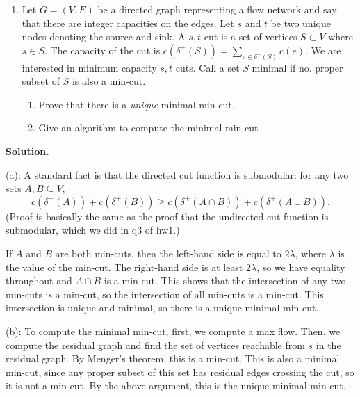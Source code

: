\documentclass[11pt,letterpaper]{article}
\theoremstyle{definition}
\newcommand{\solution}{\medskip\noindent\textbf{Solution.}\par\medskip}
\begin{document}
\begin{enumerate}[resume=q]
\item Let $G = (V, E)$ be a directed graph representing a flow network and say that there are integer capacities on the edges. Let $s$ and $t$ be two unique nodes denoting the source and sink. A $s,t$ cut is a set of vertices $S \subset V$ where $s \in S$. The capacity of the cut is $c(\delta^+(S)) = \sum_{e \in \delta^+(S)} c(e)$. We are interested in minimum capacity $s,t$ cuts. Call a set $S$ minimal if no. proper subset of $S$ is also a min-cut.
\begin{enumerate}
\item Prove that there is a \emph{unique} minimal min-cut.
\item Give an algorithm to compute the minimal min-cut
\end{enumerate}
\end{enumerate}

\solution

(a): A standard fact is that the directed cut function is submodular: for any two sets $A, B \subseteq V$,
\[
c(\delta^+(A)) + c(\delta^+(B)) \geq c(\delta^+(A \cap B)) + c(\delta^+(A \cup B)).   
\] 
(Proof is basically the same as the proof that the undirected cut function is submodular, which we did in q3 of hw1.)

If $A$ and $B$ are both min-cuts, then the left-hand side is equal to $2\lambda$, where $\lambda$ is the value of the min-cut.
The right-hand side is at least $2\lambda$, so we have equality throughout and $A\cap B$ is a min-cut.
This shows that the intersection of any two min-cuts is a min-cut, so the intersection of all min-cuts is a min-cut.
This intersection is unique and minimal, so there is a unique minimal min-cut.

(b): To compute the minimal min-cut, first, we compute a max flow.
Then, we compute the residual graph and find the set of vertices reachable from $s$ in the residual graph.
By Menger's theorem, this is a min-cut.
This is also a minimal min-cut, since any proper subset of this set has residual edges crossing the cut, so it is not a min-cut.
By the above argument, this is the unique minimal min-cut.
\end{document}
